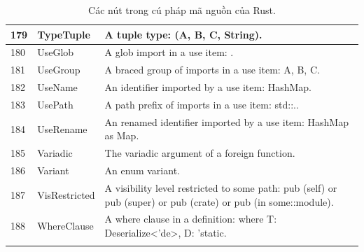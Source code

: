 \begin{longtable}{| p{} | p{} | p{} |}
179   & TypeTuple                      & A tuple type: (A, B, C, String).                                                                               \\ \hline
180   & UseGlob                        & A glob import in a use item: \*.                                                                               \\ \hline
181   & UseGroup                       & A braced group of imports in a use item: {A, B, C}.                                                            \\ \hline
182   & UseName                        & An identifier imported by a use item: HashMap.                                                                 \\ \hline
183   & UsePath                        & A path prefix of imports in a use item: std::..                                                                \\ \hline
184   & UseRename                      & An renamed identifier imported by a use item: HashMap as Map.                                                  \\ \hline
185   & Variadic                       & The variadic argument of a foreign function.                                                                   \\ \hline
186   & Variant                        & An enum variant.                                                                                               \\ \hline
187   & VisRestricted                  & A visibility level restricted to some path: pub (self) or pub (super) or pub (crate) or pub (in some::module). \\ \hline
188   & WhereClause                    & A where clause in a definition: where T: Deserialize<'de>, D: 'static.                                         \\ \hline
\caption{Các nút trong cú pháp mã nguồn của Rust.}
\label{table:c3s_nodeastrust}
\end{longtable}
\medskip